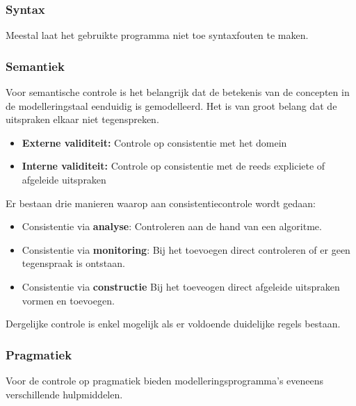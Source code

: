 \documentclass[../../main.tex]{subfiles}
\begin{document}
\subsubsection{Syntax}
Meestal laat het gebruikte programma niet toe syntaxfouten te maken.
\subsubsection{Semantiek}
Voor semantische controle is het belangrijk dat de betekenis van de concepten in de modelleringstaal eenduidig is gemodelleerd. Het is van groot belang dat de uitspraken elkaar niet tegenspreken.
\begin{itemize}
	\item \textbf{Externe validiteit:} Controle op consistentie met het domein
	\item \textbf{Interne validiteit:} Controle op consistentie met de reeds expliciete of afgeleide uitspraken
\end{itemize}
Er bestaan drie manieren waarop aan consistentiecontrole wordt gedaan:
\begin{itemize}
	\item Consistentie via \textbf{analyse}: Controleren aan de hand van een algoritme.
	\item Consistentie via \textbf{monitoring}: Bij het toevoegen direct controleren of er geen tegenspraak is ontstaan.
	\item Consistentie via \textbf{constructie} Bij het toeveogen direct afgeleide uitspraken vormen en toevoegen.
\end{itemize}
Dergelijke controle is enkel mogelijk als er voldoende duidelijke regels bestaan.
\subsubsection{Pragmatiek}
Voor de controle op pragmatiek bieden modelleringsprogramma's eveneens verschillende hulpmiddelen.
\end{document}
